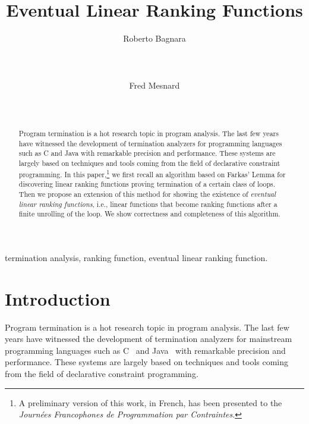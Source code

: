 \documentclass{acm_proc_article-sp}
\begin{document}
\title{Eventual Linear Ranking Functions}

\author{
\alignauthor
Roberto Bagnara \\
     \\
     \\
     \\
\alignauthor
Fred Mesnard \\
    \\
     \\
}

\maketitle

\begin{abstract}
Program termination is a hot research topic in program analysis.
The last few years have witnessed the development of termination
analyzers for programming languages such as C and Java with remarkable
precision and performance.
These systems are largely based on techniques and tools coming
from the field of declarative constraint programming.
In this paper,\footnote{A preliminary version of this work, in French, has been
    presented to the \emph{Journ\'ees Francophones de Programmation par
    Contraintes}.
}
we first recall an algorithm based on Farkas' Lemma for
discovering linear ranking functions proving termination of a certain
class of loops.  Then we propose an extension of this method for
showing the existence of \emph{eventual linear ranking functions},
i.e., linear functions that become ranking functions after a
finite unrolling of the loop.
We show correctness and completeness of this algorithm.
\end{abstract}

\begin{keywords}
termination analysis, ranking function, eventual linear ranking function.
\end{keywords}


\section{Introduction}
\label{sec:introduction}

Program termination is a hot research topic in program analysis.
The last few years have witnessed the development of termination
analyzers for mainstream programming languages such as C~\cite{CookPR06}
and Java~\cite{AlbertAGGPRRZ09,OttoBEG10,SpotoMP10} with remarkable
precision and performance.
These systems are largely based on techniques and tools coming
from the field of declarative constraint programming.
\end{document}
